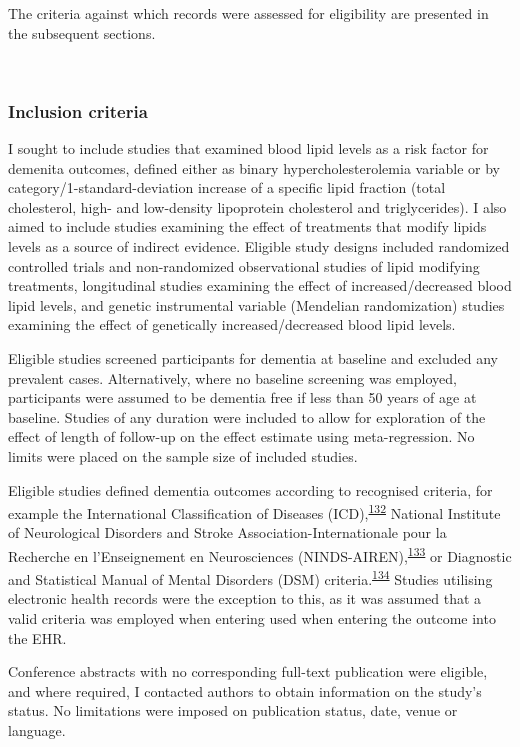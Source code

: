 \documentclass[a4paper, twoside]{templates/ociamthesis}
\begin{document}
The criteria against which records were assessed for eligibility are presented in the subsequent sections.

~

\hypertarget{inclusion-criteria}{%
\subsubsection{Inclusion criteria}\label{inclusion-criteria}}

I sought to include studies that examined blood lipid levels as a risk factor for demenita outcomes, defined either as binary hypercholesterolemia variable or by category/1-standard-deviation increase of a specific lipid fraction (total cholesterol, high- and low-density lipoprotein cholesterol and triglycerides). I also aimed to include studies examining the effect of treatments that modify lipids levels as a source of indirect evidence. Eligible study designs included randomized controlled trials and non-randomized observational studies of lipid modifying treatments, longitudinal studies examining the effect of increased/decreased blood lipid levels, and genetic instrumental variable (Mendelian randomization) studies examining the effect of genetically increased/decreased blood lipid levels.

Eligible studies screened participants for dementia at baseline and excluded any prevalent cases. Alternatively, where no baseline screening was employed, participants were assumed to be dementia free if less than 50 years of age at baseline. Studies of any duration were included to allow for exploration of the effect of length of follow-up on the effect estimate using meta-regression. No limits were placed on the sample size of included studies.

Eligible studies defined dementia outcomes according to recognised criteria, for example the International Classification of Diseases (ICD),\textsuperscript{\protect\hyperlink{ref-organizationwho1993}{132}} National Institute of Neurological Disorders and Stroke Association-Internationale pour la Recherche en l'Enseignement en Neurosciences (NINDS-AIREN),\textsuperscript{\protect\hyperlink{ref-roman1993}{133}} or Diagnostic and Statistical Manual of Mental Disorders (DSM) criteria.\textsuperscript{\protect\hyperlink{ref-edition2013}{134}} Studies utilising electronic health records were the exception to this, as it was assumed that a valid criteria was employed when entering used when entering the outcome into the EHR.

Conference abstracts with no corresponding full-text publication were eligible, and where required, I contacted authors to obtain information on the study's status. No limitations were imposed on publication status, date, venue or language.
\end{document}
